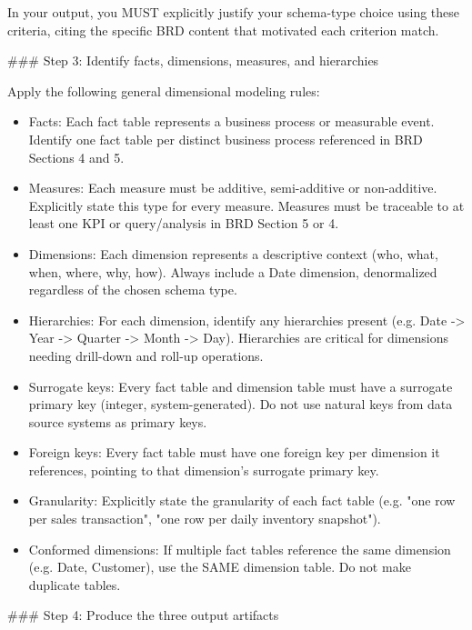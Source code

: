 In your output, you MUST explicitly justify your schema-type choice using these criteria, citing the specific BRD content that motivated each criterion match.
\newline

\#\#\# Step 3: Identify facts, dimensions, measures, and hierarchies
\newline

Apply the following general dimensional modeling rules:
\newline

\begin{itemize}
    \item Facts: Each fact table represents a business process or measurable event. Identify one fact table per distinct business process referenced in BRD Sections 4 and 5.
    \item Measures: Each measure must be additive, semi-additive or non-additive. Explicitly state this type for every measure. Measures must be traceable to at least one KPI or query/analysis in BRD Section 5 or 4.
    \item Dimensions: Each dimension represents a descriptive context (who, what, when, where, why, how). Always include a Date dimension, denormalized regardless of the chosen schema type.
    \item Hierarchies: For each dimension, identify any hierarchies present (e.g. Date -> Year -> Quarter -> Month -> Day). Hierarchies are critical for dimensions needing drill-down and roll-up operations.
    \item Surrogate keys: Every fact table and dimension table must have a surrogate primary key (integer, system-generated). Do not use natural keys from data source systems as primary keys.
    \item Foreign keys: Every fact table must have one foreign key per dimension it references, pointing to that dimension's surrogate primary key.
    \item Granularity: Explicitly state the granularity of each fact table (e.g. "one row per sales transaction", "one row per daily inventory snapshot").
    \item Conformed dimensions: If multiple fact tables reference the same dimension (e.g. Date, Customer), use the SAME dimension table. Do not make duplicate tables.
\end{itemize}

\#\#\# Step 4: Produce the three output artifacts
\newline

